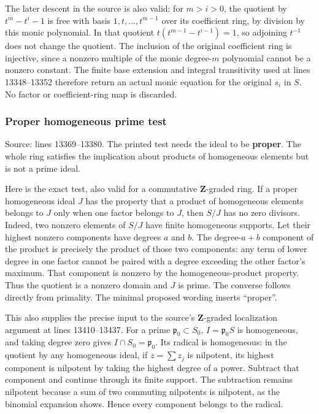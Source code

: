 The later descent in the source is also valid: for \(m>i>0\), the quotient by \(t^m-t^i-1\) is free with basis \(1,t,\ldots,t^{m-1}\) over its coefficient ring, by division by this monic polynomial. In that quotient \(t(t^{m-1}-t^{i-1})=1\), so adjoining \(t^{-1}\) does not change the quotient. The inclusion of the original coefficient ring is injective, since a nonzero multiple of the monic degree-\(m\) polynomial cannot be a nonzero constant. The finite base extension and integral transitivity used at lines 13348--13352 therefore return an actual monic equation for the original \(s_i\) in \(S\). No factor or coefficient-ring map is discarded.

\subsubsection{Proper homogeneous prime test}\label{algebra-proof-002-proper-homogeneous-prime-test}

Source: lines 13369--13380. The printed test needs the ideal to be \textbf{proper}. The whole ring satisfies the implication about products of homogeneous elements but is not a prime ideal.

Here is the exact test, also valid for a commutative \(\mathbf Z\)-graded ring. If a proper homogeneous ideal \(J\) has the property that a product of homogeneous elements belongs to \(J\) only when one factor belongs to \(J\), then \(S/J\) has no zero divisors. Indeed, two nonzero elements of \(S/J\) have finite homogeneous supports. Let their highest nonzero components have degrees \(a\) and \(b\). The degree-\(a+b\) component of the product is precisely the product of those two components: any term of lower degree in one factor cannot be paired with a degree exceeding the other factor's maximum. That component is nonzero by the homogeneous-product property. Thus the quotient is a nonzero domain and \(J\) is prime. The converse follows directly from primality. The minimal proposed wording inserts ``proper''.

This also supplies the precise input to the source's \(\mathbf Z\)-graded localization argument at lines 13410--13437. For a prime \(\mathfrak p_0\subset S_0\), \(I=\mathfrak p_0S\) is homogeneous, and taking degree zero gives \(I\cap S_0=\mathfrak p_0\). Its radical is homogeneous: in the quotient by any homogeneous ideal, if \(z=\sum z_j\) is nilpotent, its highest component is nilpotent by taking the highest degree of a power. Subtract that component and continue through its finite support. The subtraction remains nilpotent because a sum of two commuting nilpotents is nilpotent, as the binomial expansion shows. Hence every component belongs to the radical.

